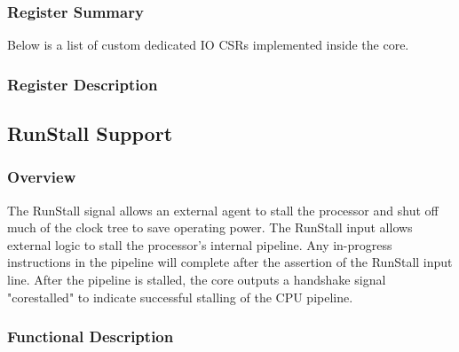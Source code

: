 \documentclass[main\_\_EN.tex]{subfiles}
\begin{document}
\subsubsection{Register Summary}
\label{sec:riscvcpu-fastio-reg-summ}


Below is a list of custom dedicated IO CSRs implemented inside the core.




\subsubsection{Register Description}
\label{sec:riscvcpu-fastio-reg-desc}



\newpage
\subsection{RunStall Support}
\label{sec:riscvcpu-custom-runstall}
\subsubsection{Overview}
\label{sec:riscvcpu-custom-runstall-overview}

The RunStall signal allows an external agent to stall the processor and shut off much of the clock tree to save operating power.
The RunStall input allows external logic to stall the processor's internal pipeline. Any in-progress instructions in the pipeline will complete after the assertion of the RunStall input line. After the pipeline is stalled, the core outputs a handshake signal "corestalled" to indicate successful stalling of the CPU pipeline.


\subsubsection{Functional Description}
\label{sec:riscvcpu-custom-runstall-feature-func-descr}
\end{document}
